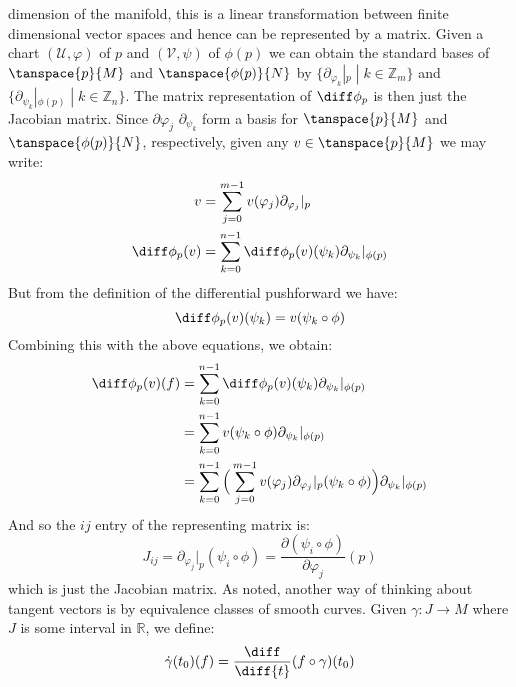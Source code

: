         dimension of the manifold, this is a linear transformation
        between finite dimensional vector spaces and hence can be
        represented by a matrix. Given a chart
        $(\mathcal{U},\varphi)$ of $p$ and $(\mathcal{V},\psi)$ of
        $\phi(p)$ we can obtain the standard bases of $\tanspace{p}{M}$
        and $\tanspace{\phi(p)}{N}$ by
        $\{\partial_{\varphi_{k}}|_{p}\;|\;k\in\mathbb{Z}_{m}\}$ and
        $\{\partial_{\psi_{k}}|_{\phi(p)}\;|\;k\in\mathbb{Z}_{n}\}$. The
        matrix representation of $\diff\phi_{p}$ is then just the
        Jacobian matrix. Since
        $\partial\varphi_{j}$ $\partial_{\psi_{k}}$ form a basis
        for $\tanspace{p}{M}$ and $\tanspace{\phi(p)}{N}$, respectively,
        given any $v\in\tanspace{p}{M}$ we may write:
        \begin{subequations}
            \begin{align}
                v&=\sum_{j=0}^{m-1}v(\varphi_{j})
                    \partial_{\varphi_{j}}|_{p}\\
                \diff\phi_{p}(v)&=\sum_{k=0}^{n-1}
                    \diff\phi_{p}(v)(\psi_{k})
                    \partial_{\psi_{k}}|_{\phi(p)}
            \end{align}
        \end{subequations}
        But from the definition of the differential pushforward we have:
        \begin{equation}
            \diff\phi_{p}(v)(\psi_{k})=v(\psi_{k}\circ\phi)
        \end{equation}
        Combining this with the above equations, we obtain:
        \begin{subequations}
            \begin{align}
                \diff\phi_{p}(v)(f)&=\sum_{k=0}^{n-1}
                    \diff\phi_{p}(v)(\psi_{k})
                    \partial_{\psi_{k}}|_{\phi(p)}\\
                &=\sum_{k=0}^{n-1}v(\psi_{k}\circ\phi)
                    \partial_{\psi_{k}}|_{\phi(p)}\\
                &=\sum_{k=0}^{n-1}\Big(
                    \sum_{j=0}^{m-1}v(\varphi_{j})
                    \partial_{\varphi_{j}}|_{p}(\psi_{k}\circ\phi)
                \Big)\partial_{\psi_{k}}|_{\phi(p)}
            \end{align}
        \end{subequations}
        And so the $ij$ entry of the representing matrix is:
        \begin{equation}
            J_{ij}=\partial_{\varphi_{j}}|_{p}(\psi_{i}\circ\phi)
            =\frac{\partial(\psi_{i}\circ\phi)}{\partial\varphi_{j}}(p)
        \end{equation}
        which is just the Jacobian matrix. As noted, another way of
        thinking about tangent vectors is by equivalence classes of
        smooth curves. Given $\gamma:J\rightarrow{M}$ where $J$ is some
        interval in $\mathbb{R}$, we define:
        \begin{equation}
            \dot{\gamma}(t_{0})(f)
                =\frac{\diff}{\diff{t}}(f\circ\gamma)(t_{0})
        \end{equation}
